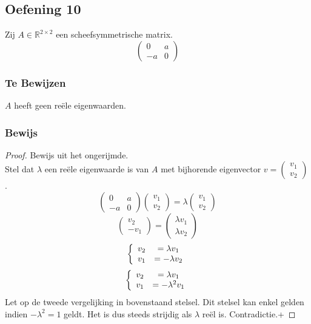 \documentclass[lineaire_algebra_oplossingen.tex]{subfiles}
\begin{document}
\subsection{Oefening 10}
Zij $A \in \mathbb{R}^{2\times 2}$ een scheefsymmetrische matrix.
\[
\begin{pmatrix}
0 & a\\
-a & 0
\end{pmatrix}
\]

\subsubsection*{Te Bewijzen}
$A$ heeft geen re\"ele eigenwaarden.

\subsubsection*{Bewijs}
\begin{proof}
Bewijs uit het ongerijmde.\\
Stel dat $\lambda$ een re\"ele eigenwaarde is van $A$ met bijhorende eigenvector $v = \begin{pmatrix}v_1\\v_2\end{pmatrix}$.
\[
\begin{pmatrix}
0 & a\\
-a & 0
\end{pmatrix}
\begin{pmatrix}v_1\\v_2\end{pmatrix}
=\lambda 
\begin{pmatrix}v_1\\v_2\end{pmatrix}
\]
\[
\begin{pmatrix}
v_2\\-v_1
\end{pmatrix}
=
\begin{pmatrix}
\lambda v_1\\\lambda v_2
\end{pmatrix}
\]
\[
\left\{
\begin{array}{c c}
v_2 &= \lambda v_1\\
v_1 &= -\lambda v_2
\end{array}
\right.
\]
\[
\left\{
\begin{array}{c c}
v_2 &= \lambda v_1\\
v_1 &= -\lambda^2 v_1
\end{array}
\right.
\]
Let op de tweede vergelijking in bovenstaand stelsel. Dit stelsel kan enkel gelden indien $-\lambda^2 = 1$ geldt. Het is dus steeds strijdig als $\lambda$ re\"el is. Contradictie.+
\end{proof}
\end{document}

